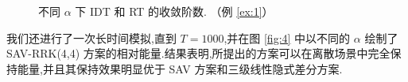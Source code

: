 	\begin{figure}[H]
		\begin{center}
		\caption{不同 $\alpha$ 下 IDT 和 RT 的收敛阶数. （例 \ref{ex:1}）} 
		\label{fig:3}
		\end{center}
		\end{figure}
		我们还进行了一次长时间模拟,直到 $T=1000$,并在图 \ref{fig:4} 中以不同的 $\alpha$ 绘制了 SAV-RRK(4,4) 方案的相对能量.结果表明,所提出的方案可以在离散场景中完全保持能量,并且其保持效果明显优于 SAV 方案和三级线性隐式差分方案.
